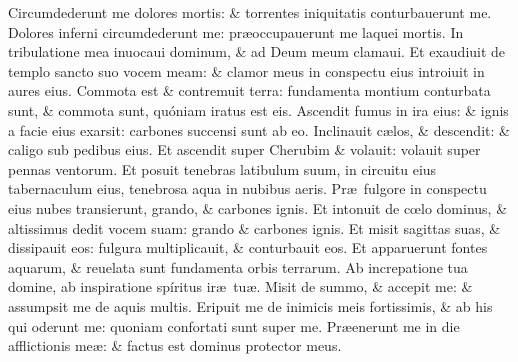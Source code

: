 \documentclass[a5paper,10pt]{book}
\def\ae{æ}
\def\oe{œ}
\begin{document}
\begin{multicols*}{2}
\newline \color{red} C\color{black}ircumdederunt me dolores mortis: \& torrentes iniquitatis conturbauerunt me.
\newline \color{red} D\color{black}olores inferni circumdederunt me: pr\ae occupauerunt me laquei mortis.
\newline \color{red} I\color{black}n tribulatione mea inuocaui dominum, \& ad Deum meum clamaui.
\newline \color{red} E\color{black}t exaudiuit de templo sancto suo vocem meam: \& clamor meus in conspectu eius introiuit in aures eius.
\newline \color{red} C\color{black}ommota est \& contremuit terra: fundamenta montium conturbata sunt, \& commota sunt, quóniam iratus est eis.
\newline \color{red} A\color{black}scendit fumus in ira eius: \& ignis a facie eius exarsit: carbones succensi sunt ab eo.
\newline \color{red} I\color{black}nclinauit c\ae los, \& descendit: \& caligo sub pedibus eius.
\newline \color{red} E\color{black}t ascendit super Cherubim \& volauit: volauit super pennas ventorum.
\newline \color{red} E\color{black}t posuit tenebras latibulum suum, in circuitu eius tabernaculum eius, tenebrosa aqua in nubibus aeris.
\newline \color{red} P\color{black}r\ae \ fulgore in conspectu eius nubes transierunt, grando, \& carbones ignis.
\newline \color{red} E\color{black}t intonuit de c\oe lo dominus, \& altissimus dedit vocem suam: grando \& carbones ignis.
\newline \color{red} E\color{black}t misit sagittas suas, \& dissipauit eos: fulgura multiplicauit, \& conturbauit eos.
\newline \color{red} E\color{black}t apparuerunt fontes aquarum, \& reuelata sunt fundamenta orbis terrarum.
\newline \color{red} A\color{black}b increpatione tua domine, ab inspiratione spíritus ir\ae \ tu\ae .
\newline \color{red} M\color{black}isit de summo, \& accepit me: \& assumpsit me de aquis multis.
\newline \color{red} E\color{black}ripuit me de inimicis meis fortissimis, \& ab his qui oderunt me: quoniam confortati sunt super me.
\newline \color{red} P\color{black}r\ae enerunt me in die afflictionis me\ae : \& factus est dominus protector meus.

\end{multicols*}
\end{document}
